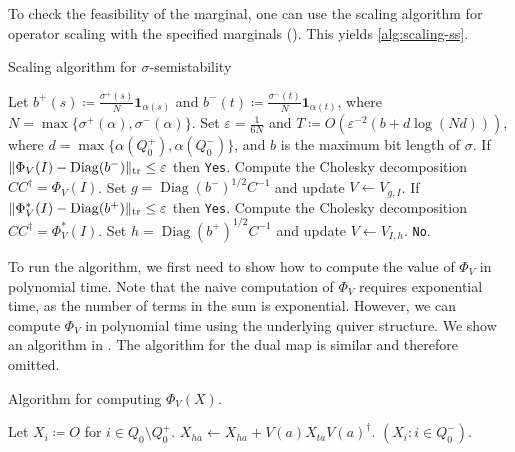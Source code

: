 \documentclass[a4paper,11pt]{article}
\numberwithin{equation}{section}
\newcommand{\eps}{\varepsilon}
\newcommand{\ones}{\mathbf{1}}
\DeclareMathOperator{\tr}{tr}
\DeclareMathOperator{\Diag}{Diag}
\DeclarePairedDelimiter{\norm}{\lVert}{\rVert}
\begin{document}
To check the feasibility of the marginal, one can use the scaling algorithm for operator scaling with the specified marginals ().
This yields \cref{alg:scaling-ss}.

\begin{algorithm}
    \caption{Scaling algorithm for $\sigma$-semistability\label{alg:scaling-ss}}
    \begin{algorithmic}[1]
        \State Let $b^+(s) \coloneqq \frac{\sigma^+(s)}{N} \ones_{\alpha(s)}$ and $b^-(t) \coloneqq \frac{\sigma^-(t)}{N} \ones_{\alpha(t)}$, where $N = \max\{\sigma^+(\alpha), \sigma^-(\alpha)\}$.
        \State Set $\eps = \frac{1}{6N}$ and $T \coloneqq O(\eps^{-2}(b + d \log (Nd)))$, where $d = \max\{\alpha(Q_0^+), \alpha(Q_0^-)\}$, and $b$ is the maximum bit length of $\sigma$.
        \State {}
        \State If $\norm{\Phi_V(I) - \Diag(b^-)}_{\tr} \leq \eps$ then \Return \texttt{Yes}.
        \State Compute the Cholesky decomposition $CC^\dagger = \Phi_V(I)$. Set $g = \Diag(b^-)^{1/2}C^{-1}$ and update $V \gets V_{g, I}$.
        \State {}
        \State If $\norm{\Phi^*_V(I) - \Diag(b^+)}_{\tr} \leq \eps$ then \Return \texttt{Yes}.
        \State Compute the Cholesky decomposition $CC^\dagger = \Phi_V^*(I)$. Set $h = \Diag(b^+)^{1/2}C^{-1}$ and update $V \gets V_{I, h}$.
        \EndFor
        \State \Return \texttt{No}.
    \end{algorithmic}
\end{algorithm}

To run the algorithm, we first need to show how to compute the value of $\Phi_V$ in polynomial time. 
Note that the naive computation of $\Phi_V$ requires exponential time, as the number of terms in the sum is exponential.
However, we can compute $\Phi_V$ in polynomial time using the underlying quiver structure.
We show an algorithm in .
The algorithm for the dual map is similar and therefore omitted.

\begin{algorithm}
    \caption{Algorithm for computing $\Phi_V(X)$.\label{alg:CP}}
    \begin{algorithmic}[1]
        \State Let $X_i \coloneqq O$ for $i \in Q_0 \setminus Q_0^+$.
            \State $X_{ha} \gets X_{ha} + V(a) X_{ta} V(a)^\dagger$.
        \EndFor
        \State \Return $(X_i : i \in Q^-_0)$.
    \end{algorithmic}
\end{algorithm}
\end{document}
